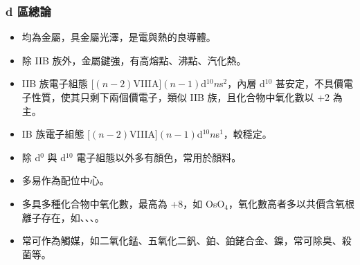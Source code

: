 \documentclass[a4paper,12pt]{report}
\begin{document}
\begin{itemize}
\begin{itemize}
\subsubsection{d 區總論}
\begin{itemize}
\item 均為金屬，具金屬光澤，是電與熱的良導體。
\item 除 IIB 族外，金屬鍵強，有高熔點、沸點、汽化熱。
\item IIB 族電子組態 [$(n-2)$VIIIA]$(n-1)$d$^{10}n$s$^2$，內層 d$^{10}$ 甚安定，不具價電子性質，使其只剩下兩個價電子，類似 IIB 族，且化合物中氧化數以 +2 為主。
\item IB 族電子組態 [$(n-2)$VIIIA]$(n-1)$d$^{10}n$s$^1$，較穩定。
\item 除 d$^0$ 與 d$^{10}$ 電子組態以外多有顏色，常用於顏料。
\item 多易作為配位中心。
\item 多具多種化合物中氧化數，最高為 +8，如 OsO$_4$，氧化數高者多以共價含氧根離子存在，如、、、。
\item 常可作為觸媒，如二氧化錳、五氧化二釩、鉑、鉑銠合金、鎳，常可除臭、殺菌等。
\end{itemize}

\end{itemize}
\end{itemize}
\end{document}

